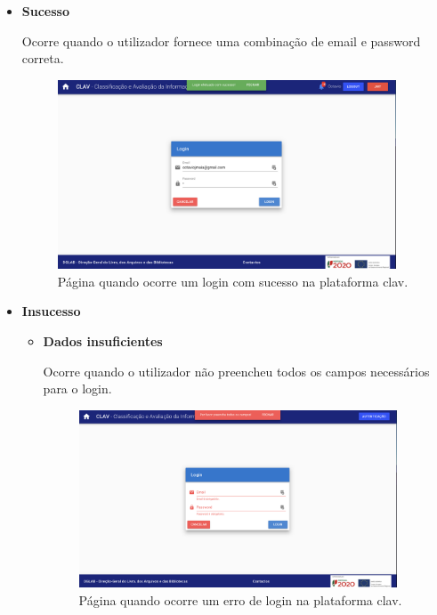 \begin{itemize}
    \vspace{-3mm}
    \item \textbf{Sucesso}
    
    Ocorre quando o utilizador fornece uma combinação de email e password correta.
    
    \begin{figure}[h!]
        \centering
        \includegraphics[width=0.95\textwidth]{img/clav/authlocal/sucessoLogin.png}
        \caption{Página quando ocorre um login com sucesso na plataforma \gls{clav}.}
        \label{fig:registoLogin}
    \end{figure}
    
    \item \textbf{Insucesso}
    
    \begin{itemize}
        \item \textbf{Dados insuficientes}
        
        Ocorre quando o utilizador não preencheu todos os campos necessários para o login.
        
        \begin{figure}[h!]
            \centering
            \includegraphics[width=0.95\textwidth]{img/clav/authlocal/erroLogin1.png}
            \caption{Página quando ocorre um erro de login na plataforma \gls{clav}.}
            \label{fig:loginErro1}
        \end{figure}
        

\end{itemize}
\end{itemize}
